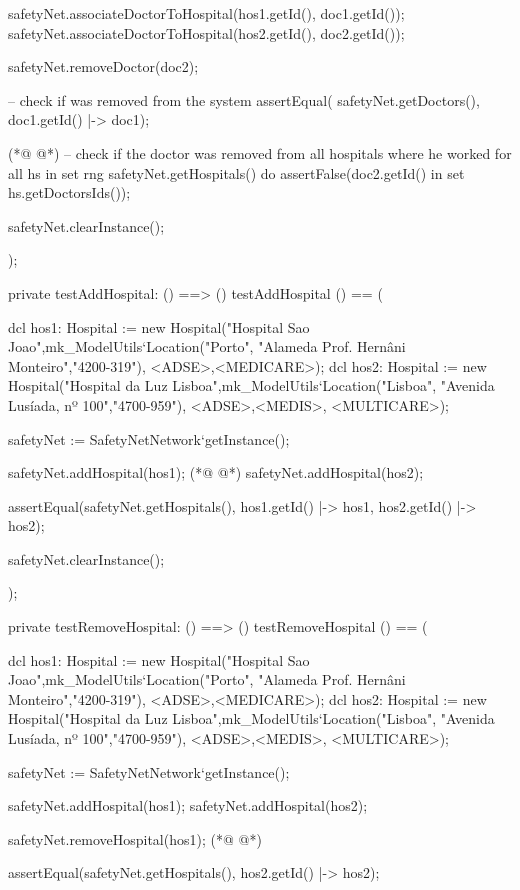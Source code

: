 \begin{vdmpp}[breaklines=true]
  safetyNet.associateDoctorToHospital(hos1.getId(), doc1.getId());
  safetyNet.associateDoctorToHospital(hos2.getId(), doc2.getId());
  
  safetyNet.removeDoctor(doc2);

  -- check if was removed from the system
  assertEqual( safetyNet.getDoctors(), {doc1.getId() |-> doc1});
  
(*@
\label{testAddHospital:215}
@*)
  -- check if the doctor was removed from all hospitals where he worked
  for all hs in set rng safetyNet.getHospitals() do
   assertFalse(doc2.getId() in set hs.getDoctorsIds());
  
  safetyNet.clearInstance();
    
);

private testAddHospital: () ==> ()
 testAddHospital () == (
  
  dcl hos1: Hospital := new Hospital("Hospital Sao Joao",mk_ModelUtils`Location("Porto", "Alameda Prof. Hernâni Monteiro","4200-319"), {<ADSE>,<MEDICARE>});
  dcl hos2: Hospital := new Hospital("Hospital da Luz Lisboa",mk_ModelUtils`Location("Lisboa", "Avenida Lusíada, nº 100","4700-959"), {<ADSE>,<MEDIS>, <MULTICARE>});
  
  safetyNet := SafetyNetNetwork`getInstance();
   
  safetyNet.addHospital(hos1);
(*@
\label{testRemoveHospital:232}
@*)
  safetyNet.addHospital(hos2);
  
  assertEqual(safetyNet.getHospitals(), { hos1.getId() |-> hos1, hos2.getId() |-> hos2});
  
  safetyNet.clearInstance();
    
);

private testRemoveHospital: () ==> ()
 testRemoveHospital () == (
  
  dcl hos1: Hospital := new Hospital("Hospital Sao Joao",mk_ModelUtils`Location("Porto", "Alameda Prof. Hernâni Monteiro","4200-319"), {<ADSE>,<MEDICARE>});
  dcl hos2: Hospital := new Hospital("Hospital da Luz Lisboa",mk_ModelUtils`Location("Lisboa", "Avenida Lusíada, nº 100","4700-959"), {<ADSE>,<MEDIS>, <MULTICARE>});
  
  safetyNet := SafetyNetNetwork`getInstance();
   
  safetyNet.addHospital(hos1);
  safetyNet.addHospital(hos2);

  safetyNet.removeHospital(hos1);
(*@
\label{testAssociateDoctorToAnHospital:252}
@*)

  assertEqual(safetyNet.getHospitals(), { hos2.getId() |-> hos2});
  

\end{vdmpp}
